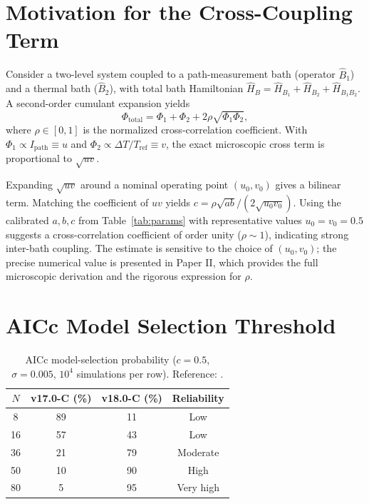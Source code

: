 \documentclass[aps,pra,reprint,amsmath,amssymb,superscriptaddress]{revtex4-2}
\begin{document}
\appendix

\section{Motivation for the Cross-Coupling Term}
\label{app:cumulant}
Consider a two-level system coupled to a path-measurement bath (operator $\hat{B}_1$) and a thermal bath ($\hat{B}_2$), with total bath Hamiltonian $\hat{H}_B = \hat{H}_{B_1} + \hat{H}_{B_2} + \hat{H}_{B_1 B_2}$. A second-order cumulant expansion yields
\begin{equation}
\Phi_{\text{total}} = \Phi_1 + \Phi_2 + 2\rho\sqrt{\Phi_1 \Phi_2},
\label{eq:cumulant}
\end{equation}
where $\rho \in [0, 1]$ is the normalized cross-correlation coefficient. With $\Phi_1 \propto I_{\text{path}} \equiv u$ and $\Phi_2 \propto \Delta T/T_{\text{ref}} \equiv v$, the exact microscopic cross term is proportional to $\sqrt{uv}$.

Expanding $\sqrt{uv}$ around a nominal operating point $(u_0, v_0)$ gives a bilinear term. Matching the coefficient of $uv$ yields $c = \rho\sqrt{ab}/(2\sqrt{u_0 v_0})$. Using the calibrated $a,b,c$ from Table~\ref{tab:params} with representative values $u_0 = v_0 = 0.5$ suggests a cross-correlation coefficient of order unity ($\rho \sim 1$), indicating strong inter-bath coupling. The estimate is sensitive to the choice of $(u_0, v_0)$; the precise numerical value is presented in Paper II, which provides the full microscopic derivation and the rigorous expression for $\rho$.

\section{AICc Model Selection Threshold}
\label{app:aicc}
\begin{table}[htbp]
\centering
\caption{AICc model-selection probability ($c=0.5$, $\sigma=0.005$, $10^4$ simulations per row). Reference: \cite{Burnham2002}.}
\label{tab:aicc}
\begin{tabular}{c c c c}
\toprule
$N$ & v17.0-C (\%) & v18.0-C (\%) & Reliability \\
\midrule
8 & 89 & 11 & Low \\
16 & 57 & 43 & Low \\
36 & 21 & 79 & Moderate \\
50 & 10 & 90 & High \\
80 & 5 & 95 & Very high \\
\bottomrule
\end{tabular}
\end{table}
\end{document}
